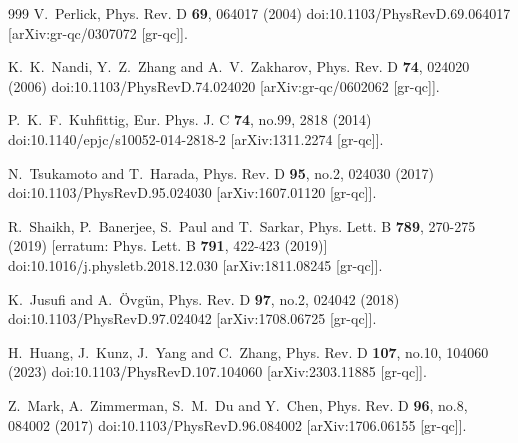\documentclass[aps,preprint,groupedaddress,nofootinbib,superscriptaddress,showkeys,showpacs,eqsecnum,amsmath,amssymb]{revtex4-1}
\begin{document}
\begin{thebibliography}{999}
V.~Perlick,
Phys. Rev. D \textbf{69}, 064017 (2004)
doi:10.1103/PhysRevD.69.064017
[arXiv:gr-qc/0307072 [gr-qc]].

K.~K.~Nandi, Y.~Z.~Zhang and A.~V.~Zakharov,
Phys. Rev. D \textbf{74}, 024020 (2006)
doi:10.1103/PhysRevD.74.024020
[arXiv:gr-qc/0602062 [gr-qc]].

P.~K.~F.~Kuhfittig,
Eur. Phys. J. C \textbf{74}, no.99, 2818 (2014)
doi:10.1140/epjc/s10052-014-2818-2
[arXiv:1311.2274 [gr-qc]].

N.~Tsukamoto and T.~Harada,
Phys. Rev. D \textbf{95}, no.2, 024030 (2017)
doi:10.1103/PhysRevD.95.024030
[arXiv:1607.01120 [gr-qc]].

R.~Shaikh, P.~Banerjee, S.~Paul and T.~Sarkar,
Phys. Lett. B \textbf{789}, 270-275 (2019)
[erratum: Phys. Lett. B \textbf{791}, 422-423 (2019)]
doi:10.1016/j.physletb.2018.12.030
[arXiv:1811.08245 [gr-qc]].

K.~Jusufi and A.~\"Ovg\"un,
Phys. Rev. D \textbf{97}, no.2, 024042 (2018)
doi:10.1103/PhysRevD.97.024042
[arXiv:1708.06725 [gr-qc]].

H.~Huang, J.~Kunz, J.~Yang and C.~Zhang,
Phys. Rev. D \textbf{107}, no.10, 104060 (2023)
doi:10.1103/PhysRevD.107.104060
[arXiv:2303.11885 [gr-qc]].

Z.~Mark, A.~Zimmerman, S.~M.~Du and Y.~Chen,
Phys. Rev. D \textbf{96}, no.8, 084002 (2017)
doi:10.1103/PhysRevD.96.084002
[arXiv:1706.06155 [gr-qc]].


\end{thebibliography}
\end{document}
